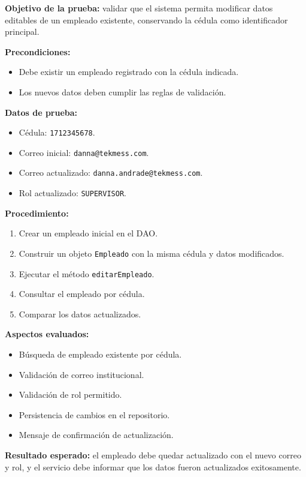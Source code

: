 \documentclass[12pt,a4paper]{article}
\begin{document}
\textbf{Objetivo de la prueba:} validar que el sistema permita modificar datos editables de un empleado existente, conservando la cédula como identificador principal.

\textbf{Precondiciones:}
\begin{itemize}[leftmargin=*]
    \item Debe existir un empleado registrado con la cédula indicada.
    \item Los nuevos datos deben cumplir las reglas de validación.
\end{itemize}

\textbf{Datos de prueba:}
\begin{itemize}[leftmargin=*]
    \item Cédula: \texttt{1712345678}.
    \item Correo inicial: \texttt{danna@tekmess.com}.
    \item Correo actualizado: \texttt{danna.andrade@tekmess.com}.
    \item Rol actualizado: \texttt{SUPERVISOR}.
\end{itemize}

\textbf{Procedimiento:}
\begin{enumerate}[leftmargin=*]
    \item Crear un empleado inicial en el DAO.
    \item Construir un objeto \texttt{Empleado} con la misma cédula y datos modificados.
    \item Ejecutar el método \texttt{editarEmpleado}.
    \item Consultar el empleado por cédula.
    \item Comparar los datos actualizados.
\end{enumerate}

\textbf{Aspectos evaluados:}
\begin{itemize}[leftmargin=*]
    \item Búsqueda de empleado existente por cédula.
    \item Validación de correo institucional.
    \item Validación de rol permitido.
    \item Persistencia de cambios en el repositorio.
    \item Mensaje de confirmación de actualización.
\end{itemize}

\textbf{Resultado esperado:} el empleado debe quedar actualizado con el nuevo correo y rol, y el servicio debe informar que los datos fueron actualizados exitosamente.
\end{document}
